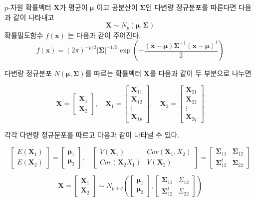 \documentclass[
]{book}
\theoremstyle{definition}
\theoremstyle{definition}
\theoremstyle{definition}
\theoremstyle{definition}
\theoremstyle{remark}
\begin{document}
\(p\)-차원 확률벡터 \(\bm X\)가 평균이 \(\bm \mu\) 이고 공분산이 \(\bm \Sigma\)인
다변량 정규분포를 따른다면 다음과 같이 나타내고 \[ \bm X \sim N_p(\bm \mu, \bm \Sigma ) \]
확률밀도함수 \(f(\bm x)\) 는 다음과 갇이 주어진다.
\[ f(\bm x) = (2 \pi)^{-p/2} | \bm \Sigma|^{-1/2} 
   \exp \left ( - \frac{(\bm x-\bm \mu) \bm \Sigma^{-1}(\bm x-\bm \mu)^t}{2} \right ) \]

다변량 정규분포 \(N(\bm \mu, \bm \Sigma)\)를 따르는 확률벡터 \(\bm X\)를 다음과 같이 두 부분으로 나누면

\[ 
  \bm X = 
    \begin{bmatrix}
  \bm X_1 \\
  \bm X_2
  \end{bmatrix}, \quad
  \bm X_1 = 
    \begin{bmatrix}
  \bm X_{11} \\
  \bm X_{12} \\
  \bm \vdots \\
  \bm X_{1p}
  \end{bmatrix}, \quad 
  \bm X_2= 
    \begin{bmatrix}
  \bm X_{21} \\
  \bm X_{22} \\
  \bm \vdots \\
  \bm X_{2q}
  \end{bmatrix}
  \]

각각 다변량 정규분포를 따르고 다음과 같이 나타낼 수 있다.

\[ 
  \begin{bmatrix}
  E(\bm X_1) \\
  E(\bm X_2)
  \end{bmatrix}
  =
    \begin{bmatrix}
  \bm \mu_1 \\
  \bm \mu_2
  \end{bmatrix}
  , \quad 
  \begin{bmatrix}
  V(\bm X_1) & Cov(\bm X_1, X_2) \\
  Cov(\bm X_2 X_1) & V(\bm X_2)
  \end{bmatrix}
  =
    \begin{bmatrix}
  \bm \Sigma_{11} & \bm \Sigma_{12} \\
  \bm \Sigma^t_{12} & \bm \Sigma_{22}
  \end{bmatrix}
  \]

\[  \bm X =
    \begin{bmatrix}
  \bm X_1 \\
  \bm X_2
  \end{bmatrix}
  \sim
  N_{p+q} \left (
    \begin{bmatrix}
    \bm \mu_1 \\
    \bm \mu_2
    \end{bmatrix}
    ,\begin{bmatrix}
    \bm \Sigma_{11} & \Sigma_{12} \\
    \bm \Sigma^t_{12} & \Sigma_{22}
    \end{bmatrix}
    \right )
  \]
\end{document}
